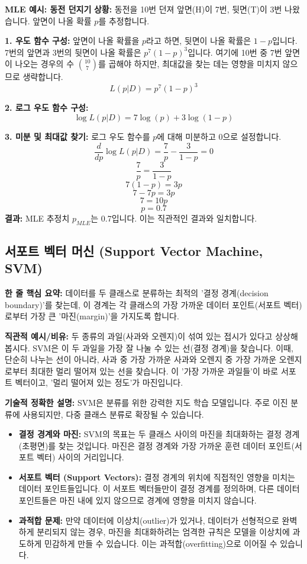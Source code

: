 \documentclass[11pt,a4paper]{article}
\theoremstyle{definition}
\begin{document}
\begin{examplebox}
\textbf{MLE 예시: 동전 던지기}
\textbf{상황:} 동전을 10번 던져 앞면(H)이 7번, 뒷면(T)이 3번 나왔습니다. 앞면이 나올 확률 $p$를 추정합니다.

\textbf{1. 우도 함수 구성:}
앞면이 나올 확률을 $p$라고 하면, 뒷면이 나올 확률은 $1-p$입니다.
7번의 앞면과 3번의 뒷면이 나올 확률은 $p^7 (1-p)^3$입니다.
여기에 10번 중 7번 앞면이 나오는 경우의 수 $\binom{10}{7}$를 곱해야 하지만, 최대값을 찾는 데는 영향을 미치지 않으므로 생략합니다.
$$ L(p|D) = p^7 (1-p)^3 $$

\textbf{2. 로그 우도 함수 구성:}
$$ \log L(p|D) = 7 \log(p) + 3 \log(1-p) $$

\textbf{3. 미분 및 최대값 찾기:}
로그 우도 함수를 $p$에 대해 미분하고 0으로 설정합니다.
$$ \frac{d}{dp} \log L(p|D) = \frac{7}{p} - \frac{3}{1-p} = 0 $$
$$ \frac{7}{p} = \frac{3}{1-p} $$
$$ 7(1-p) = 3p $$
$$ 7 - 7p = 3p $$
$$ 7 = 10p $$
$$ p = 0.7 $$
\textbf{결과:} MLE 추정치 $p_{MLE}$는 0.7입니다. 이는 직관적인 결과와 일치합니다.
\end{examplebox}

\newpage
\subsection{서포트 벡터 머신 (Support Vector Machine, SVM)}

\begin{conceptbox}
\textbf{한 줄 핵심 요약:} 데이터를 두 클래스로 분류하는 최적의 '결정 경계(decision boundary)'를 찾는데, 이 경계는 각 클래스의 가장 가까운 데이터 포인트(서포트 벡터)로부터 가장 큰 '마진(margin)'을 가지도록 합니다.
\end{conceptbox}

\textbf{직관적 예시/비유:}
두 종류의 과일(사과와 오렌지)이 섞여 있는 접시가 있다고 상상해 봅시다. SVM은 이 두 과일을 가장 잘 나눌 수 있는 선(결정 경계)을 찾습니다. 이때, 단순히 나누는 선이 아니라, 사과 중 가장 가까운 사과와 오렌지 중 가장 가까운 오렌지로부터 최대한 멀리 떨어져 있는 선을 찾습니다. 이 '가장 가까운 과일들'이 바로 서포트 벡터이고, '멀리 떨어져 있는 정도'가 마진입니다.

\textbf{기술적 정확한 설명:}
SVM은 분류를 위한 강력한 지도 학습 모델입니다. 주로 이진 분류에 사용되지만, 다중 클래스 분류로 확장될 수 있습니다.

\begin{itemize}
    \item \textbf{결정 경계와 마진:} SVM의 목표는 두 클래스 사이의 마진을 최대화하는 결정 경계(초평면)를 찾는 것입니다. 마진은 결정 경계와 가장 가까운 훈련 데이터 포인트(서포트 벡터) 사이의 거리입니다.
    \item \textbf{서포트 벡터 (Support Vectors):} 결정 경계의 위치에 직접적인 영향을 미치는 데이터 포인트들입니다. 이 서포트 벡터들만이 결정 경계를 정의하며, 다른 데이터 포인트들은 마진 내에 있지 않으므로 경계에 영향을 미치지 않습니다.
    \item \textbf{과적합 문제:} 만약 데이터에 이상치(outlier)가 있거나, 데이터가 선형적으로 완벽하게 분리되지 않는 경우, 마진을 최대화하려는 엄격한 규칙은 모델을 이상치에 과도하게 민감하게 만들 수 있습니다. 이는 과적합(overfitting)으로 이어질 수 있습니다.
\end{itemize}
\end{document}
